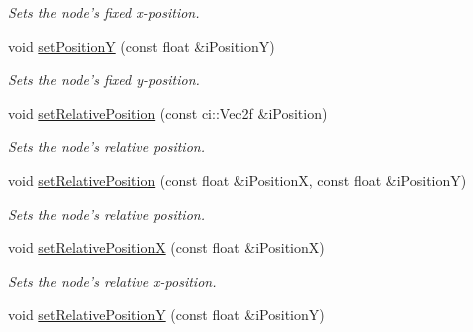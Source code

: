 \begin{DoxyCompactItemize}
\begin{DoxyCompactList}\small\item\em Sets the node's fixed x-\/position. \end{DoxyCompactList}\item 
\hypertarget{class_gui_base_adf16803de83c7ddd40262ae8185ce818}{void \hyperlink{class_gui_base_adf16803de83c7ddd40262ae8185ce818}{set\-Position\-Y} (const float \&i\-Position\-Y)}\label{class_gui_base_adf16803de83c7ddd40262ae8185ce818}

\begin{DoxyCompactList}\small\item\em Sets the node's fixed y-\/position. \end{DoxyCompactList}\item 
\hypertarget{class_gui_base_af86716fca942b5b0624018365a0f23c1}{void \hyperlink{class_gui_base_af86716fca942b5b0624018365a0f23c1}{set\-Relative\-Position} (const ci\-::\-Vec2f \&i\-Position)}\label{class_gui_base_af86716fca942b5b0624018365a0f23c1}

\begin{DoxyCompactList}\small\item\em Sets the node's relative position. \end{DoxyCompactList}\item 
\hypertarget{class_gui_base_a1ed4c24befd781d83997c2484a595560}{void \hyperlink{class_gui_base_a1ed4c24befd781d83997c2484a595560}{set\-Relative\-Position} (const float \&i\-Position\-X, const float \&i\-Position\-Y)}\label{class_gui_base_a1ed4c24befd781d83997c2484a595560}

\begin{DoxyCompactList}\small\item\em Sets the node's relative position. \end{DoxyCompactList}\item 
\hypertarget{class_gui_base_a7531a4234bff4e52b5305a6f679fa424}{void \hyperlink{class_gui_base_a7531a4234bff4e52b5305a6f679fa424}{set\-Relative\-Position\-X} (const float \&i\-Position\-X)}\label{class_gui_base_a7531a4234bff4e52b5305a6f679fa424}

\begin{DoxyCompactList}\small\item\em Sets the node's relative x-\/position. \end{DoxyCompactList}\item 
\hypertarget{class_gui_base_a1a5f52bc55ced711f170369ec7b5e9f6}{void \hyperlink{class_gui_base_a1a5f52bc55ced711f170369ec7b5e9f6}{set\-Relative\-Position\-Y} (const float \&i\-Position\-Y)}\label{class_gui_base_a1a5f52bc55ced711f170369ec7b5e9f6}


\end{DoxyCompactItemize}
